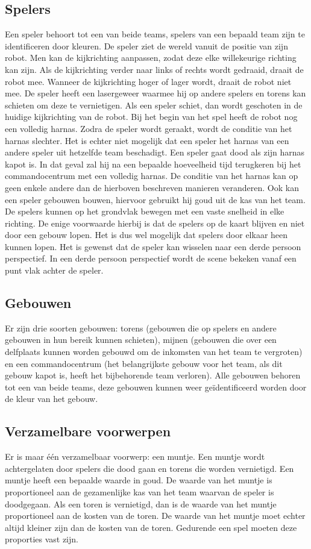 \subsection{Spelers}
Een speler behoort tot een van beide teams, spelers van een bepaald team zijn te identificeren door kleuren. De speler ziet de wereld vanuit de positie van zijn robot. Men kan de kijkrichting aanpassen, zodat deze elke willekeurige richting kan zijn. Als de kijkrichting verder naar links of rechts wordt gedraaid, draait de robot mee. Wanneer de kijkrichting hoger of lager wordt, draait de robot niet mee. De speler heeft een lasergeweer waarmee hij op andere spelers en torens kan schieten om deze te vernietigen. Als een speler schiet, dan wordt geschoten in de huidige kijkrichting van de robot. Bij het begin van het spel heeft de robot nog een volledig harnas. Zodra de speler wordt geraakt, wordt de conditie van het harnas slechter. Het is echter niet mogelijk dat een speler het harnas van een andere speler uit hetzelfde team beschadigt.
\FloatBarrier
Een speler gaat dood als zijn harnas kapot is. In dat geval zal hij na een bepaalde hoeveelheid tijd terugkeren bij het commandocentrum met een volledig harnas. De conditie van het harnas kan op geen enkele andere dan de hierboven beschreven manieren veranderen. Ook kan een speler gebouwen bouwen, hiervoor gebruikt hij goud uit de kas van het team. De spelers kunnen op het grondvlak bewegen met een vaste snelheid in elke richting. De enige voorwaarde hierbij is dat de spelers op de kaart blijven en niet door een gebouw lopen. Het is dus wel mogelijk dat spelers door elkaar heen kunnen lopen. Het is gewenst dat de speler kan wisselen naar een derde persoon perspectief. In een derde persoon perspectief wordt de scene bekeken vanaf een punt vlak achter de speler.

\subsection{Gebouwen}
Er zijn drie soorten gebouwen: torens (gebouwen die op spelers en andere gebouwen in hun bereik kunnen schieten), mijnen (gebouwen die over een delfplaats kunnen worden gebouwd om de inkomsten van het team te vergroten) en een commandocentrum (het belangrijkste gebouw voor het team, als dit gebouw kapot is, heeft het bijbehorende team verloren). Alle gebouwen behoren tot een van beide teams, deze gebouwen kunnen weer ge\"identificeerd worden door de kleur van het gebouw.

\subsection{Verzamelbare voorwerpen}
Er is maar \'e\'en verzamelbaar voorwerp: een muntje. Een muntje wordt achtergelaten door spelers die dood gaan en torens die worden vernietigd. Een muntje heeft een bepaalde waarde in goud. De waarde van het muntje is proportioneel aan de gezamenlijke kas van het team waarvan de speler is doodgegaan. Als een toren is vernietigd, dan is de waarde van het muntje proportioneel aan de kosten van de toren. De waarde van het muntje moet echter altijd kleiner zijn dan de kosten van de toren. Gedurende een spel moeten deze proporties vast zijn.

